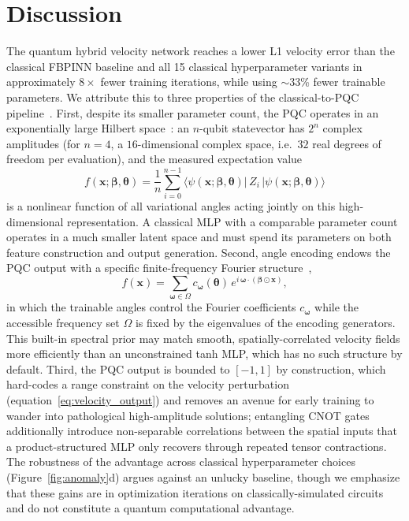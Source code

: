 \section{Discussion}\label{sec:discussion}

The quantum hybrid velocity network reaches a lower L1 velocity error than the classical FBPINN baseline and all 15 classical hyperparameter variants in approximately $8\times$ fewer training iterations, while using $\sim$$33$\% fewer trainable parameters. We attribute this to three properties of the classical-to-PQC pipeline~. First, despite its smaller parameter count, the PQC operates in an exponentially large Hilbert space~: an $n$-qubit statevector has $2^n$ complex amplitudes (for $n=4$, a $16$-dimensional complex space, i.e.\ $32$ real degrees of freedom per evaluation), and the measured expectation value
\begin{equation}
    f(\mathbf{x};\boldsymbol{\beta},\boldsymbol{\theta}) = \frac{1}{n}\sum_{i=0}^{n-1} \langle\psi(\mathbf{x};\boldsymbol{\beta},\boldsymbol{\theta})|\,Z_i\,|\psi(\mathbf{x};\boldsymbol{\beta},\boldsymbol{\theta})\rangle
\end{equation}
is a nonlinear function of all variational angles acting jointly on this high-dimensional representation. A classical MLP with a comparable parameter count operates in a much smaller latent space and must spend its parameters on both feature construction and output generation. Second, angle encoding endows the PQC output with a specific finite-frequency Fourier structure~,
\begin{equation}
    f(\mathbf{x}) = \sum_{\boldsymbol{\omega}\in\Omega} c_{\boldsymbol{\omega}}(\boldsymbol{\theta})\, e^{i\,\boldsymbol{\omega}\cdot(\boldsymbol{\beta}\odot\mathbf{x})},
\end{equation}
in which the trainable angles control the Fourier coefficients $c_{\boldsymbol{\omega}}$ while the accessible frequency set $\Omega$ is fixed by the eigenvalues of the encoding generators. This built-in spectral prior may match smooth, spatially-correlated velocity fields more efficiently than an unconstrained tanh MLP, which has no such structure by default. Third, the PQC output is bounded to $[-1, 1]$ by construction, which hard-codes a range constraint on the velocity perturbation (equation~\ref{eq:velocity_output}) and removes an avenue for early training to wander into pathological high-amplitude solutions; entangling CNOT gates additionally introduce non-separable correlations between the spatial inputs that a product-structured MLP only recovers through repeated tensor contractions. The robustness of the advantage across classical hyperparameter choices (Figure~\ref{fig:anomaly}d) argues against an unlucky baseline, though we emphasize that these gains are in optimization iterations on classically-simulated circuits and do not constitute a quantum computational advantage.

